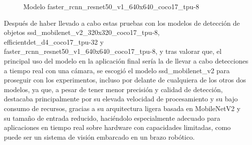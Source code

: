   	\begin{figure}[H]
    		\begin{center}
      		\subcapcentertrue
      		\hspace{2mm}
    	\end{center}
    	\caption{Modelo faster\_rcnn\_resnet50\_v1\_640x640\_coco17\_tpu-8 }
    	\label{fig:modelo_faster_rcnn_resnet50}
  	\end{figure}	
  	
\pagebreak

Después de haber llevado a cabo estas pruebas con los modelos de detección de objetos ssd\_mobilenet\_v2\_320x320\_coco17\_tpu-8, efficientdet\_d4\_coco17\_tpu-32 y faster\_rcnn\_resnet50\_v1\_640x640\_coco17\_tpu-8, y tras valorar que, el principal uso del modelo en la aplicación final sería la de llevar a cabo detecciones a tiempo real con una cámara, se escogió el modelo ssd\_mobilenet\_v2 para proseguir con los experimentos, incluso por delante de cualquiera de los otros dos modelos, ya que, a pesar de tener menor precisión y calidad de detección, destacaba principalmente por su elevada velocidad de procesamiento y su bajo consumo de recursos, gracias a su arquitectura ligera basada en MobileNetV2 y su tamaño de entrada reducido, haciéndolo especialmente adecuado para aplicaciones en tiempo real sobre hardware con capacidades limitadas, como puede ser un sistema de visión embarcado en un brazo robótico.\\

